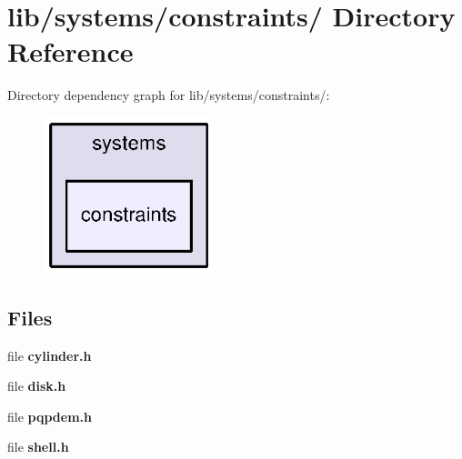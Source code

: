 \section{lib/systems/constraints/ \-Directory \-Reference}
\label{dir_8d466be0d3e8c36514d653d27730561e}
\-Directory dependency graph for lib/systems/constraints/\-:\nopagebreak
\begin{figure}[H]
\begin{center}
\leavevmode
\includegraphics[width=140pt]{dir_8d466be0d3e8c36514d653d27730561e_dep}
\end{center}
\end{figure}
\subsection*{\-Files}
\begin{DoxyCompactItemize}
\item 
file {\bf cylinder.\-h}
\item 
file {\bf disk.\-h}
\item 
file {\bf pqpdem.\-h}
\item 
file {\bf shell.\-h}
\end{DoxyCompactItemize}
